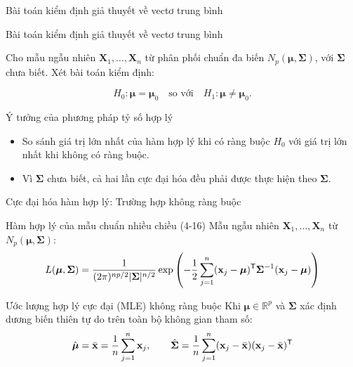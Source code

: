 
\begin{frame}{Bài toán kiểm định giả thuyết về vectơ trung bình}

  \begin{exampleblock}{Bài toán kiểm định giả thuyết về vectơ trung bình}

    Cho mẫu ngẫu nhiên $\mathbf{X}_1,\dots,\mathbf{X}_n$ từ phân phối chuẩn đa biến
    $N_p(\boldsymbol{\mu},\boldsymbol{\Sigma})$, với
    $\boldsymbol{\Sigma}$ chưa biết. Xét bài toán kiểm định:

    \[
      H_0:\boldsymbol{\mu}=\boldsymbol{\mu}_0
      \quad \text{so với} \quad
      H_1:\boldsymbol{\mu}\neq\boldsymbol{\mu}_0.
    \]

  \end{exampleblock}
  \begin{block}{Ý tưởng của phương pháp tỷ số hợp lý}
    \begin{itemize}{}

      \item So sánh giá trị lớn nhất của hàm hợp lý khi có ràng buộc $H_0$
      với giá trị lớn nhất khi không có ràng buộc.

      \item Vì $\boldsymbol{\Sigma}$ chưa biết, cả hai lần cực đại hóa đều phải
      được thực hiện theo $\boldsymbol{\Sigma}$.

    \end{itemize}
  \end{block}
\end{frame}

\begin{frame}{Cực đại hóa hàm hợp lý: Trường hợp không ràng buộc}
  \begin{block}{Hàm hợp lý của mẫu chuẩn nhiều chiều (4-16)}
    Mẫu ngẫu nhiên $\mathbf{X}_1, \dots, \mathbf{X}_n$ từ $N_p(\boldsymbol{\mu}, \boldsymbol{\Sigma})$:
    \[
      L(\boldsymbol{\mu}, \boldsymbol{\Sigma}) = \frac{1}{(2\pi)^{np/2}|\boldsymbol{\Sigma}|^{n/2}} \exp\left( -\frac{1}{2} \sum_{j=1}^n (\mathbf{x}_j - \boldsymbol{\mu})^{\mathsf T} \boldsymbol{\Sigma}^{-1} (\mathbf{x}_j - \boldsymbol{\mu}) \right)
    \]
  \end{block}

  \begin{exampleblock}{Ước lượng hợp lý cực đại (MLE) không ràng buộc}
    Khi $\boldsymbol{\mu} \in \mathbb{R}^p$ và $\boldsymbol{\Sigma}$ xác định dương biến thiên tự do trên toàn bộ không gian tham số:
    \[
      \hat{\boldsymbol{\mu}} = \bar{\mathbf{x}} = \frac{1}{n}\sum_{j=1}^n \mathbf{x}_j, \qquad
      \hat{\boldsymbol{\Sigma}} = \frac{1}{n}\sum_{j=1}^n (\mathbf{x}_j - \bar{\mathbf{x}})(\mathbf{x}_j - \bar{\mathbf{x}})^{\mathsf T}
    \]
  \end{exampleblock}
\end{frame}

